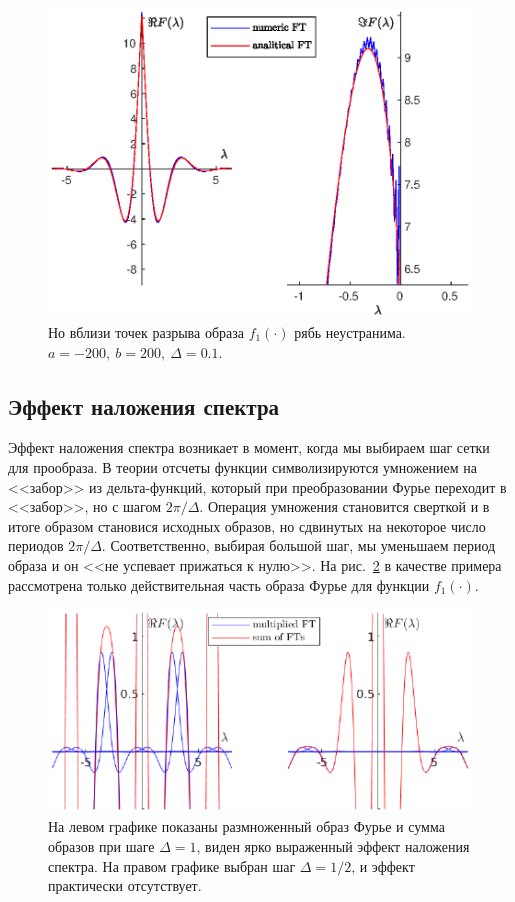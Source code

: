 \documentclass[12pt, a4paper]{article} %
\begin{document}
\begin{figure}[b]
    \centering
    \includegraphics[width=\textwidth]{figures/ripple3.eps}
    \caption{
    Но вблизи точек разрыва образа $f_1(\cdot)$ рябь неустранима.\newline
    $a = -200,\ b = 200,\ \Delta = 0.1$.}
    \label{fig:ripple3}
\end{figure}

\subsection{Эффект наложения спектра}

Эффект наложения спектра возникает в момент, когда мы выбираем шаг сетки для прообраза.
В теории отсчеты функции символизируются умножением на <<забор>> из дельта-функций,
который при преобразовании Фурье переходит в <<забор>>, но с шагом $2\pi\!/\!\Delta$.
Операция умножения становится сверткой и в итоге образом становися исходных
образов, но сдвинутых на некоторое число периодов $2\pi\!/\!\Delta$.
Соответственно, выбирая большой шаг, мы уменьшаем период образа и он
<<не успевает прижаться к нулю>>.
На рис.~\ref{fig:aliasing} в качестве примера рассмотрена только действительная часть образа Фурье для функции $f_1(\cdot)$.

\begin{figure}[b]
    \centering
    \includegraphics[width=\textwidth]{figures/aliasing.eps}
    \caption{
        На левом графике показаны размноженный образ Фурье и сумма образов при шаге
        $\Delta = 1$, виден ярко выраженный эффект наложения спектра.
        На правом графике выбран шаг $\Delta=1\!/\!2$, и эффект практически отсутствует.
    }
    \label{fig:aliasing}
\end{figure}



\end{document}
